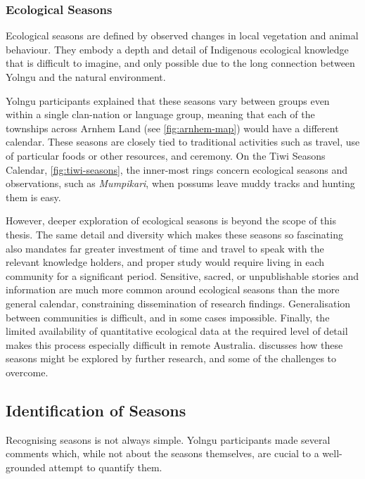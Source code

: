 \subsubsection{Ecological Seasons}
Ecological seasons are defined by observed changes in local vegetation
and animal behaviour.  They embody a depth and detail of Indigenous
ecological knowledge that is difficult to imagine, and only possible
due to the long connection between Yolngu and the natural environment.

Yolngu participants explained that these seasons vary between groups even within
a single clan-nation or language group, meaning that each of the townships
across Arnhem Land (see \cref{fig:arnhem-map}) would have a different
calendar. These seasons are closely tied to traditional activities such as
travel, use of particular foods or other resources, and ceremony.
%
On the Tiwi Seasons Calendar, \cref{fig:tiwi-seasons}, the inner-most
rings concern ecological seasons and observations, such as
\textit{Mumpikari}, when possums leave muddy tracks and hunting them is easy.

However, deeper exploration of ecological seasons is beyond the scope of this thesis.
The same detail and diversity which makes these seasons so fascinating
also mandates far greater investment of time and travel to speak
with the relevant knowledge holders, and proper study would require
living in each community for a significant period.
Sensitive, sacred, or unpublishable stories and information are much more
common around ecological seasons than the more general calendar,
constraining dissemination of research findings.  Generalisation between
communities is difficult, and in some cases impossible.  Finally, the
limited availability of quantitative ecological data at the required level
of detail makes this process especially difficult in remote Australia.
%
 discusses how these seasons might be explored
by further research, and some of the challenges to overcome.



\subsection{Identification of Seasons}
\label{subsec:detection-advice}

Recognising seasons is not always simple.  Yolngu participants made
several comments which, while not about the seasons themselves, are
cucial to a well-grounded attempt to quantify them.

